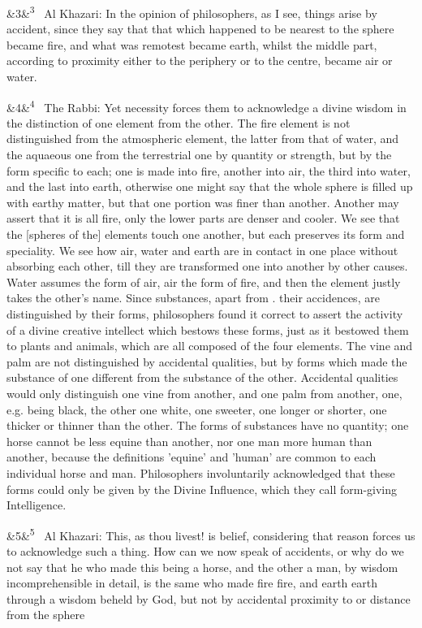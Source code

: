 \documentclass[12pt]{article}
\newcommand{\para}[1][]{\par\noindent\ifx&#1&\else\textsuperscript{\footnotesize #1}~\fi}
\begin{document}
\para[3] Al Khazari: In the opinion of philosophers, as I see, things arise by accident, since they say that that which happened to be nearest to the sphere became fire, and what was remotest became earth, whilst the middle part, according to proximity either to the periphery or to the centre, became air or water.

\para[4] The Rabbi: Yet necessity forces them to acknowledge a divine wisdom in the distinction of one element from the other. The fire element is not distinguished from the atmospheric element, the latter from that of water, and the aquaeous one from the terrestrial one by quantity or strength, but by the form specific to each; one is made into fire, another into air, the third into water, and the last into earth, otherwise one might say that the whole sphere is filled up with earthy matter, but that one portion was finer than another. Another may assert that it is all fire, only the lower parts are denser and cooler. We see that the [spheres of the] elements touch one another, but each preserves its form and speciality. We see how air, water and earth are in contact in one place without absorbing each other, till they are transformed one into another by other causes. Water assumes the form of air, air the form of fire, and then the element justly takes the other's name. Since substances, apart from . their accidences, are distinguished by their forms, philosophers found it correct to assert the activity of a divine creative intellect which bestows these forms, just as it bestowed them to plants and animals, which are all composed of the four elements. The vine and palm are not distinguished by accidental qualities, but by forms which made the substance of one different from the substance of the other. Accidental qualities would only distinguish one vine from another, and one palm from another, one, e.g. being black, the other one white, one sweeter, one longer or shorter, one thicker or thinner than the other. The forms of substances have no quantity; one horse cannot be less equine than another, nor one man more human than another, because the definitions 'equine' and 'human' are common to each individual horse and man. Philosophers involuntarily acknowledged that these forms could only be given by the Divine Influence, which they call form-giving Intelligence.

\para[5] Al Khazari: This, as thou livest! is belief, considering that reason forces us to acknowledge such a thing. How can we now speak of accidents, or why do we not say that he who made this being a horse, and the other a man, by wisdom incomprehensible in detail, is the same who made fire fire, and earth earth through a wisdom beheld by God, but not by accidental proximity to or distance from the sphere
\end{document}

